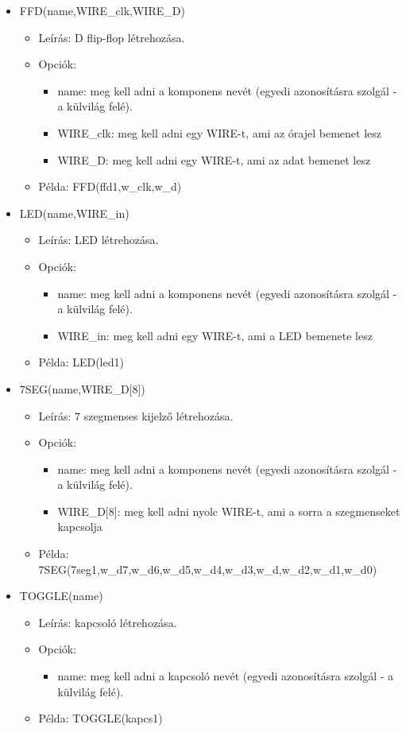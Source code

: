 \begin{itemize}
\item FFD(name,WIRE\_clk,WIRE\_D)
	\begin{itemize}
	\item Leírás: D flip-flop létrehozása.
	\item Opciók: 
		\begin{itemize}
			\item name: meg kell adni a komponens nevét (egyedi azonosításra szolgál - a külvilág felé).
			\item WIRE\_clk: meg kell adni egy WIRE-t, ami az órajel bemenet lesz
			\item WIRE\_D: meg kell adni egy WIRE-t, ami az adat bemenet lesz
		\end{itemize}
	\item Példa: FFD(ffd1,w\_clk,w\_d)
	\end{itemize}
	
\item LED(name,WIRE\_in)
	\begin{itemize}
	\item Leírás: LED létrehozása.
	\item Opciók: 
		\begin{itemize}
			\item name: meg kell adni a komponens nevét (egyedi azonosításra szolgál - a külvilág felé).
			\item WIRE\_in: meg kell adni egy WIRE-t, ami a LED bemenete lesz
		\end{itemize}
	\item Példa: LED(led1)
	\end{itemize}

\item 7SEG(name,WIRE\_D[8])
	\begin{itemize}
	\item Leírás: 7 szegmenses kijelző létrehozása.
	\item Opciók: 
		\begin{itemize}
			\item name: meg kell adni a komponens nevét (egyedi azonosításra szolgál - a külvilág felé).
			\item WIRE\_D[8]: meg kell adni nyolc WIRE-t, ami a sorra a szegmenseket kapcsolja
		\end{itemize}
	\item Példa: 7SEG(7seg1,w\_d7,w\_d6,w\_d5,w\_d4,w\_d3,w\_d,w\_d2,w\_d1,w\_d0)
	\end{itemize}
	
\item TOGGLE(name)
	\begin{itemize}
	\item Leírás: kapcsoló létrehozása.
	\item Opciók: 
		\begin{itemize}
			\item name: meg kell adni a kapcsoló nevét (egyedi azonosításra szolgál - a külvilág felé).
		\end{itemize}
	\item Példa: TOGGLE(kapcs1)
	\end{itemize}		


\end{itemize}
